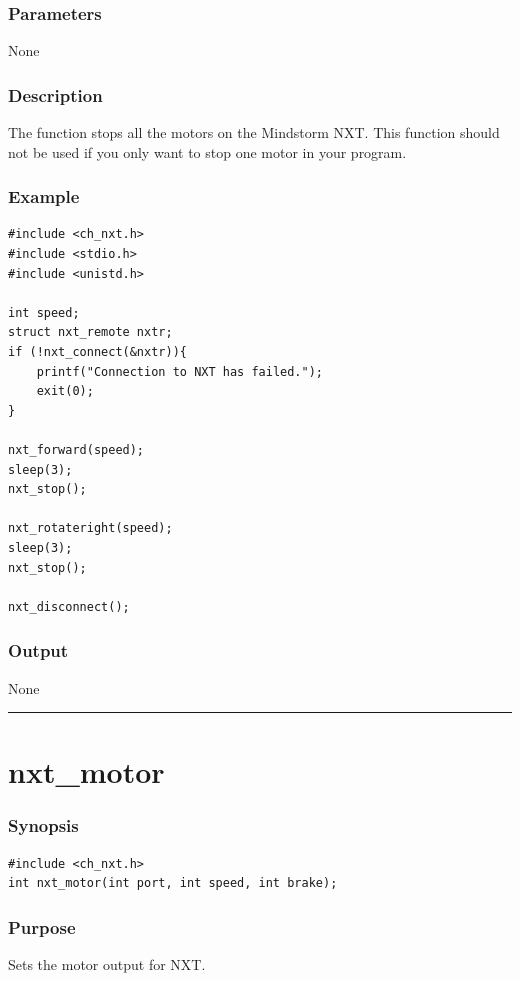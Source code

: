 \documentclass[12pt]{article}
\begin{document}
\subsubsection*{Parameters}
None

\subsubsection*{Description}
The function stops all the motors on the Mindstorm NXT. This 
function should not be used if you only want to stop one motor in 
your program.

\subsubsection*{Example}
\begin{verbatim}
#include <ch_nxt.h> 
#include <stdio.h>
#include <unistd.h>

int speed;
struct nxt_remote nxtr;
if (!nxt_connect(&nxtr)){
    printf("Connection to NXT has failed.");
    exit(0);
}
    
nxt_forward(speed);
sleep(3);
nxt_stop();

nxt_rotateright(speed);
sleep(3);
nxt_stop();

nxt_disconnect();
\end{verbatim}

\subsubsection*{Output}
None 
\\

\hrule
\newpage

\section*{nxt\_motor}

\subsubsection*{Synopsis}
\begin{verbatim}
#include <ch_nxt.h>
int nxt_motor(int port, int speed, int brake);
\end{verbatim}

\subsubsection*{Purpose}
Sets the motor output for NXT.
\end{document}
